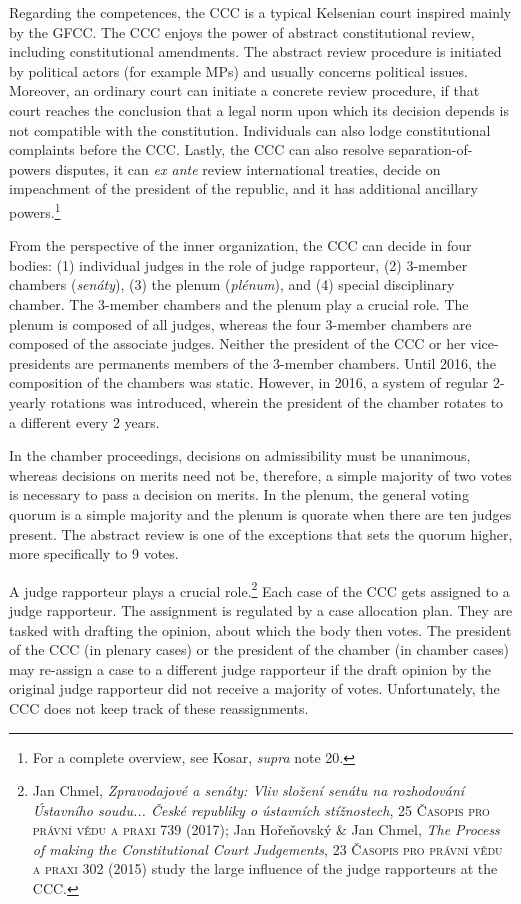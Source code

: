 \documentclass[
  11pt,
]{article}
\begin{document}
Regarding the competences, the CCC is a typical Kelsenian court inspired mainly by the GFCC. The CCC enjoys the power of abstract constitutional review, including constitutional amendments. The abstract review procedure is initiated by political actors (for example MPs) and usually concerns political issues. Moreover, an ordinary court can initiate a concrete review procedure, if that court reaches the conclusion that a legal norm upon which its decision depends is not compatible with the constitution. Individuals can also lodge constitutional complaints before the CCC. Lastly, the CCC can also resolve separation-of-powers disputes, it can \emph{ex ante} review international treaties, decide on impeachment of the president of the republic, and it has additional ancillary powers.\footnote{For a complete overview, see Kosar, \emph{supra} note 20.}

From the perspective of the inner organization, the CCC can decide in four bodies: (1) individual judges in the role of judge rapporteur, (2) 3-member chambers (\emph{senáty}), (3) the plenum (\emph{plénum}), and (4) special disciplinary chamber. The 3-member chambers and the plenum play a crucial role. The plenum is composed of all judges, whereas the four 3-member chambers are composed of the associate judges. Neither the president of the CCC or her vice-presidents are permanents members of the 3-member chambers. Until 2016, the composition of the chambers was static. However, in 2016, a system of regular 2-yearly rotations was introduced, wherein the president of the chamber rotates to a different every 2 years.

In the chamber proceedings, decisions on admissibility must be unanimous, whereas decisions on merits need not be, therefore, a simple majority of two votes is necessary to pass a decision on merits. In the plenum, the general voting quorum is a simple majority and the plenum is quorate when there are ten judges present. The abstract review is one of the exceptions that sets the quorum higher, more specifically to 9 votes.

A judge rapporteur plays a crucial role.\footnote{Jan Chmel, \emph{Zpravodajové a senáty: Vliv složení senátu na rozhodování Ústavního soudu... České republiky o ústavních stížnostech}, 25 \textsc{Časopis pro právní vědu a praxi} 739 (2017); Jan Hořeňovský \& Jan Chmel, \emph{The Process of making the Constitutional Court Judgements}, 23 \textsc{Časopis pro právní vědu a praxi} 302 (2015) study the large influence of the judge rapporteurs at the CCC.} Each case of the CCC gets assigned to a judge rapporteur. The assignment is regulated by a case allocation plan. They are tasked with drafting the opinion, about which the body then votes. The president of the CCC (in plenary cases) or the president of the chamber (in chamber cases) may re-assign a case to a different judge rapporteur if the draft opinion by the original judge rapporteur did not receive a majority of votes. Unfortunately, the CCC does not keep track of these reassignments.
\end{document}
